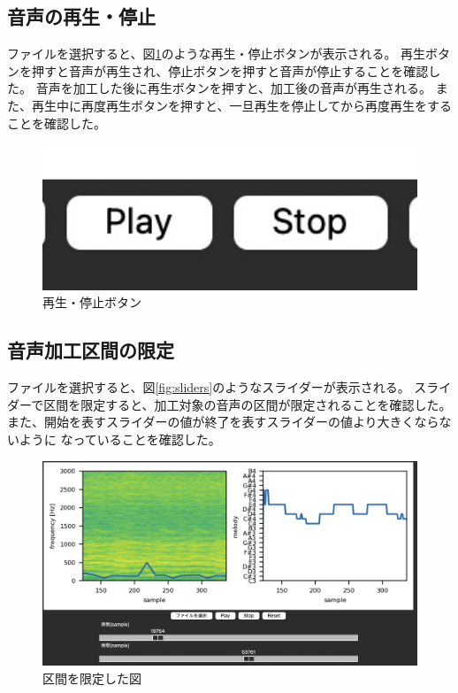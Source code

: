 \documentclass[a4paper,11pt]{jsarticle}
\begin{document}
\subsection{音声の再生・停止}
ファイルを選択すると、図\ref{fig:play_stop_button}のような再生・停止ボタンが表示される。
再生ボタンを押すと音声が再生され、停止ボタンを押すと音声が停止することを確認した。
音声を加工した後に再生ボタンを押すと、加工後の音声が再生される。
また、再生中に再度再生ボタンを押すと、一旦再生を停止してから再度再生をすることを確認した。

\begin{figure}[h]
\centering
\includegraphics[keepaspectratio, width=13cm]
{./images/play_stop_buttons.jpg}
\caption{再生・停止ボタン}
\label{fig:play_stop_button}
\end{figure}

\subsection{音声加工区間の限定}
ファイルを選択すると、図\ref{fig:sliders}のようなスライダーが表示される。
スライダーで区間を限定すると、加工対象の音声の区間が限定されることを確認した。
また、開始を表すスライダーの値が終了を表すスライダーの値より大きくならないように
なっていることを確認した。

\begin{figure}[h]
\centering
\includegraphics[keepaspectratio, width=13cm]
{./images/filtered_figures.jpg}
\caption{区間を限定した図}
\label{fig:filtered_figures}
\end{figure}
\end{document}
